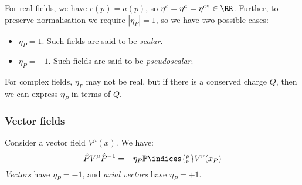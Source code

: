 \documentclass{jknotes}
\begin{document}
For real fields, we have \(c(p) = a(p)\), so \(\eta^c = \eta^a = {\eta^c}^* \in \RR\). Further, to preserve normalisation we require \(|\eta_P| = 1\), so we have two possible cases:
\begin{itemize}
    \item \(\eta_P = 1\). Such fields are said to be \emph{scalar}.
    \item \(\eta_P = -1\). Such fields are said to be \emph{pseudoscalar}.
\end{itemize}

For complex fields, \(\eta_P\) may not be real, but if there is a conserved charge \(Q\), then we can express \(\eta_P\) in terms of \(Q\).

\subsubsection{Vector fields}
Consider a vector field \(V^\mu(x)\). We have:
\begin{equation}
    \hat{P}V^\mu\hat{P}^{-1} = -\eta_P \mathbb{P}\indices{^\mu_\nu}V^\nu(x_P)
\end{equation}
\emph{Vectors} have \(\eta_P = -1\), and \emph{axial vectors} have \(\eta_P = +1\).
\end{document}
